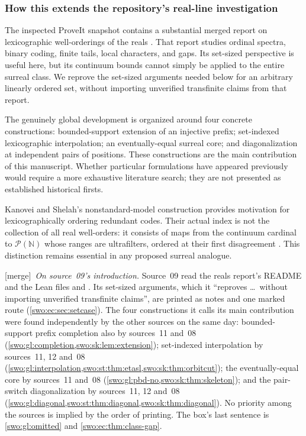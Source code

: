 \documentclass[11pt]{article}
\theoremstyle{definition}
\theoremstyle{remark}
\newcommand{\merge}{\textsf{[merge]}}
\begin{document}
\subsubsection{How this extends the repository's real-line investigation}
The inspected ProveIt snapshot contains a substantial merged report on
lexicographic well-orderings of the reals \cite{ProveItReals}. That report
studies ordinal spectra, binary coding, finite tails, local characters,
and gaps. Its set-sized perspective is useful here, but its continuum
bounds cannot simply be applied to the entire surreal class. We reprove
the set-sized arguments needed below for an arbitrary linearly ordered
set, without importing unverified transfinite claims from that report.

The genuinely global development is organized around four concrete
constructions: bounded-support extension of an injective prefix;
set-indexed lexicographic interpolation; an eventually-equal surreal
core; and diagonalization at independent pairs of positions. These
constructions are the main contribution of this manuscript. Whether
particular formulations have appeared previously would require a more
exhaustive literature search; they are not presented as established
historical firsts.

Kanovei and Shelah's nonstandard-model construction provides motivation
for lexicographically ordering redundant codes. Their actual index is
not the collection of all real well-orders: it consists of maps from the
continuum cardinal to $\mathcal P(\mathbb N)$ whose ranges are ultrafilters,
ordered at their first disagreement \cite[\S1]{KanoveiShelah}. This distinction
remains essential in any proposed surreal analogue.


\merge\ \emph{On source~09's introduction.} Source~09 read the reals
report's README and the Lean files  and
. Its set-sized arguments, which it
``reproves \ldots\ without importing unverified transfinite claims'', are
printed as notes and one marked route (\cref{swo:ec:sec:setcase}). The four
constructions it calls its main contribution were found independently by the
other sources on the same day: bounded-support prefix completion also by
sources~11 and~08 (\cref{swo:gl:completion,swo:sk:lem:extension});
set-indexed interpolation by sources~11, 12 and~08
(\cref{swo:gl:interpolation,swo:st:thm:etasl,swo:sk:thm:orbitcut}); the
eventually-equal core by sources~11 and~08
(\cref{swo:gl:pbd-no,swo:sk:thm:skeleton}); and the pair-switch
diagonalization by sources~11, 12 and~08
(\cref{swo:gl:diagonal,swo:st:thm:diagonal,swo:sk:thm:diagonal}). No priority
among the sources is implied by the order of printing. The box's last
sentence is \cref{swo:gl:omitted} and \cref{swo:ec:thm:class-gap}.
\end{document}
